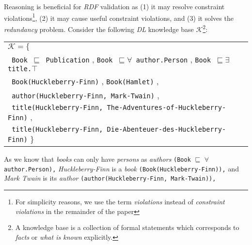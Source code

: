 \documentclass{acm_proc_article-sp}
\newcommand{\ms}[1]{%
  \texttt{#1}
}
\newenvironment{DL}{
  \vspace{0cm}
  \begin{tabular}{l l}

}{
  \end{tabular}
}
\begin{document}
Reasoning is beneficial for \emph{RDF} validation as 
(1) it may resolve constraint violations\footnote{For simplicity reasons, we use the term \emph{violations} instead of \emph{constraint violations} in the remainder of the paper}, 
(2) it may cause useful constraint violations, and 
(3) it solves the \emph{redundancy} problem. 
Consider the following \emph{DL} knowledge base $\mathcal{K}$\footnote{A knowledge base is a collection of formal statements  which corresponds to \emph{facts} or  \emph{what is known} explicitly.}:
{\scriptsize
\begin{center}
\begin{DL} 
$\mathcal{K}=\{$ \\ 
 \ms{ Book $\sqsubseteq$ Publication}, \ms{Book $\sqsubseteq \forall$ author.Person}, \ms{Book $\sqsubseteq \exists$ title.$\top$}\\
 \ms{ Book(Huckleberry-Finn)}, \ms{Book(Hamlet)},\\
 \ms{ author(Huckleberry-Finn, Mark-Twain)},\\
 \ms{ title(Huckleberry-Finn, The-Adventures-of-Huckleberry-Finn)},\\
 \ms{ title(Huckleberry-Finn, Die-Abenteuer-des-Huckleberry-Finn)}\}\\ 
\end{DL}
\end{center}
}%
As we know that \emph{books} can only have \emph{persons} as \emph{authors} {\small \ms{(Book} \ms{$\sqsubseteq$} \ms{$\forall$} \ms{author.Person),}} 
{\em Huckleberry-Finn} is a \emph{book}  {\small\ms{(Book(Huckleberry-Finn)),}} 
and \emph{Mark Twain} is its \emph{author} {\small\ms{(author(Huckleberry-Finn, Mark-Twain)),}}
\end{document}
